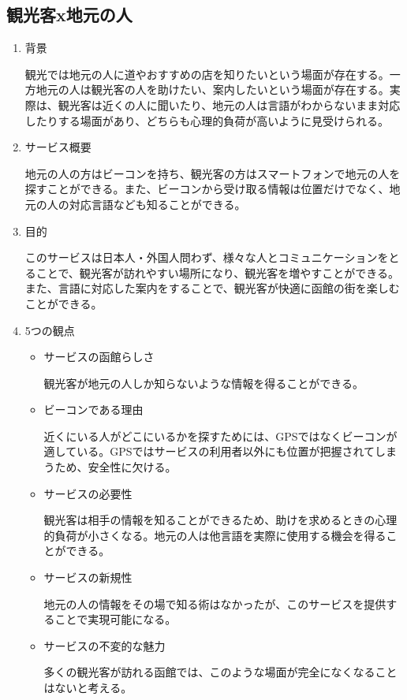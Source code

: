 \subsection{観光客x地元の人}
\begin{enumerate}
    \item 背景
    \par 観光では地元の人に道やおすすめの店を知りたいという場面が存在する。一方地元の人は観光客の人を助けたい、案内したいという場面が存在する。実際は、観光客は近くの人に聞いたり、地元の人は言語がわからないまま対応したりする場面があり、どちらも心理的負荷が高いように見受けられる。
    \item サービス概要
    \par 地元の人の方はビーコンを持ち、観光客の方はスマートフォンで地元の人を探すことができる。また、ビーコンから受け取る情報は位置だけでなく、地元の人の対応言語なども知ることができる。
    \item 目的
    \par このサービスは日本人・外国人問わず、様々な人とコミュニケーションをとることで、観光客が訪れやすい場所になり、観光客を増やすことができる。また、言語に対応した案内をすることで、観光客が快適に函館の街を楽しむことができる。
    \item 5つの観点
    \begin{itemize}
        \item サービスの函館らしさ
        \par 観光客が地元の人しか知らないような情報を得ることができる。
        \item ビーコンである理由
        \par 近くにいる人がどこにいるかを探すためには、GPSではなくビーコンが適している。GPSではサービスの利用者以外にも位置が把握されてしまうため、安全性に欠ける。
        \item サービスの必要性
        \par 観光客は相手の情報を知ることができるため、助けを求めるときの心理的負荷が小さくなる。地元の人は他言語を実際に使用する機会を得ることができる。
        \item サービスの新規性
        \par 地元の人の情報をその場で知る術はなかったが、このサービスを提供することで実現可能になる。
        \item サービスの不変的な魅力
        \par 多くの観光客が訪れる函館では、このような場面が完全になくなることはないと考える。
    \end{itemize}
\end{enumerate}

